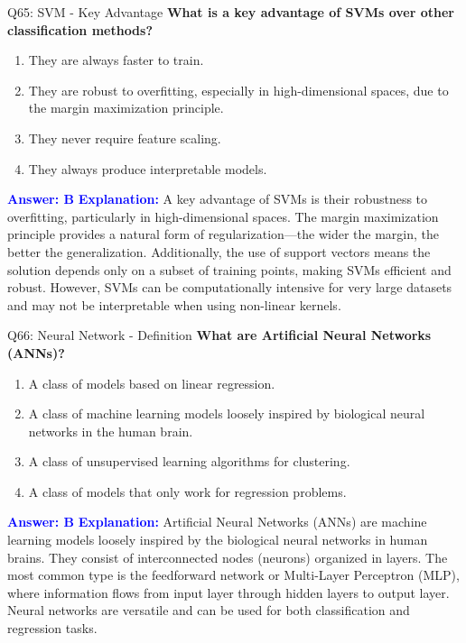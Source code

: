 \documentclass[8pt]{beamer}
\begin{document}
	\begin{frame}{Q65: SVM - Key Advantage}
		\fontsize{6.5}{7.5}\selectfont
		\textbf{What is a key advantage of SVMs over other classification methods?}
		\begin{enumerate}
			\item They are always faster to train.
			\item They are robust to overfitting, especially in high-dimensional spaces, due to the margin maximization principle.
			\item They never require feature scaling.
			\item They always produce interpretable models.
		\end{enumerate}
		\vspace{0.1cm}
		\textcolor{blue}{\textbf{Answer: B}}
		\vspace{0.2cm}
		\textcolor{blue}{\textbf{Explanation:}} A key advantage of SVMs is their robustness to overfitting, particularly in high-dimensional spaces. The margin maximization principle provides a natural form of regularization—the wider the margin, the better the generalization. Additionally, the use of support vectors means the solution depends only on a subset of training points, making SVMs efficient and robust. However, SVMs can be computationally intensive for very large datasets and may not be interpretable when using non-linear kernels.
	\end{frame}
	
	
	\begin{frame}{Q66: Neural Network - Definition}
		\fontsize{6.5}{7.5}\selectfont
		\textbf{What are Artificial Neural Networks (ANNs)?}
		\begin{enumerate}
			\item A class of models based on linear regression.
			\item A class of machine learning models loosely inspired by biological neural networks in the human brain.
			\item A class of unsupervised learning algorithms for clustering.
			\item A class of models that only work for regression problems.
		\end{enumerate}
		\vspace{0.1cm}
		\textcolor{blue}{\textbf{Answer: B}}
		\vspace{0.1cm}
		\textcolor{blue}{\textbf{Explanation:}} Artificial Neural Networks (ANNs) are machine learning models loosely inspired by the biological neural networks in human brains. They consist of interconnected nodes (neurons) organized in layers. The most common type is the feedforward network or Multi-Layer Perceptron (MLP), where information flows from input layer through hidden layers to output layer. Neural networks are versatile and can be used for both classification and regression tasks.
	\end{frame}
	
\end{document}
